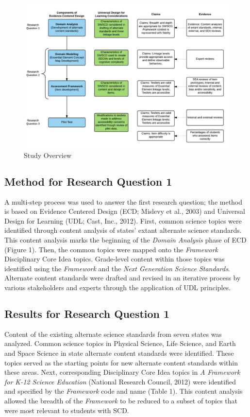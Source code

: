 \documentclass[11.5pt]{sig-alternate} %
\begin{document}
\begin{large}
\begin{figure}[ht]
    \centering
    \includegraphics[width=1\linewidth]{images/fig1.png}
    \caption{Study Overview}
\end{figure}

\subsection*{Method for Research Question 1}

A multi-step process was used to answer the first research question; the method is based on Evidence Centered Design (ECD; Mislevy et al., 2003) and Universal Design for Learning (UDL; Cast, Inc., 2012). First, common science topics were identified through content analysis of states' extant alternate science standards. This content analysis marks the beginning of the \textit{Domain Analysis} phase of ECD (Figure 1). Then, the common topics were mapped onto the \textit{Framework} Disciplinary Core Idea topics. Grade-level content within those topics was identified using the \textit{Framework} and the \textit{Next Generation Science Standards}. Alternate content standards were drafted and revised in an iterative process by various stakeholders and experts through the application of UDL principles. 

\subsection*{Results for Research Question 1}

Content of the existing alternate science standards from seven states was analyzed. Common science topics in Physical Science, Life Science, and Earth and Space Science in state alternate content standards were identified. These topics served as the starting points for new alternate content standards within these areas. Next, corresponding Disciplinary Core Idea topics in \textit{A Framework for K-12 Science Education} (National Research Council, 2012) were identified and specified by the \textit{Framework} code and name (Table 1). This content analysis allowed the breadth of the \textit{Framework} to be reduced to a subset of topics that were most relevant to students with SCD.


\end{large}
\end{document}
